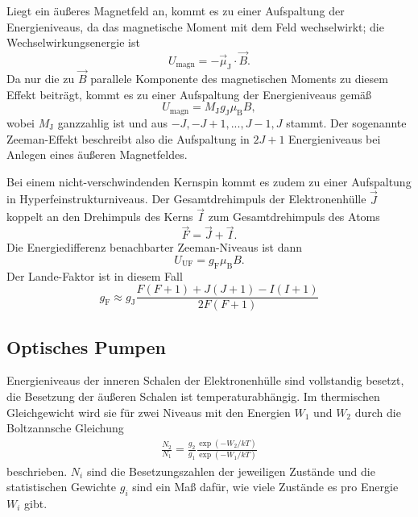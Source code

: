 Liegt ein äußeres Magnetfeld an, kommt es zu einer Aufspaltung der Energieniveaus, da das magnetische Moment mit dem Feld
wechselwirkt; die Wechselwirkungsenergie ist
\begin{equation}
  U_\text{magn} = -\vec{\mu}_\text{J}\cdot\vec{B}.
\end{equation}
Da nur die zu $\vec{B}$ parallele Komponente des magnetischen Moments zu diesem Effekt beiträgt, kommt es zu einer Aufspaltung
der Energieniveaus gemäß
\begin{equation}
  U_\text{magn} = M_\text{J}g_\text{J}\mu_\text{B}B,
\end{equation}
wobei $M_\text{J}$ ganzzahlig ist und aus $-J, -J+1, ..., J-1, J$ stammt. Der sogenannte Zeeman-Effekt beschreibt also die
Aufspaltung in $2J+1$ Energieniveaus bei Anlegen eines äußeren Magnetfeldes.

Bei einem nicht-verschwindenden Kernspin kommt es zudem zu einer Aufspaltung in Hyperfeinstrukturniveaus.
Der Gesamtdrehimpuls der Elektronenhülle $\vec{J}$ koppelt an den Drehimpuls des Kerns $\vec{I}$ zum Gesamtdrehimpuls des Atoms
\begin{equation}
  \vec{F} = \vec{J} + \vec{I}.
\end{equation}
Die Energiedifferenz benachbarter Zeeman-Niveaus ist dann
\begin{equation}
  U_\text{UF} = g_\text{F}\mu_\text{B}B.
\end{equation}
Der Lande-Faktor ist in diesem Fall
\begin{equation}
  g_\text{F} \approx g_\text{J}\frac{F(F+1)+J(J+1)-I(I+1)}{2F(F+1)}
\end{equation}

\subsection{Optisches Pumpen}

Energieniveaus der inneren Schalen der Elektronenhülle sind vollstandig besetzt, die Besetzung der äußeren Schalen ist
temperaturabhängig. Im thermischen Gleichgewicht wird sie für zwei Niveaus mit den Energien $W_1$ und $W_2$ durch die
Boltzannsche Gleichung
\begin{align}
  \frac{N_2}{N_1} = \frac{g_2}{g_1}\frac{\exp(-W_2/kT)}{\exp(-W_1/kT)}
  \label{boltz}
\end{align}
beschrieben. $N_i$ sind die Besetzungszahlen der jeweiligen Zustände und die statistischen Gewichte $g_i$ sind ein Maß
dafür, wie viele Zustände es pro Energie $W_i$ gibt.

